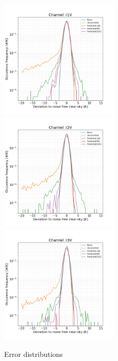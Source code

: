 \documentclass[amt, manuscript]{copernicus}
\begin{document}
\begin{figure}[t]
	\includegraphics[height=57mm]{Figures/ICI_I1V_single.png} 
	\includegraphics[height=57mm]{Figures/ICI_I2V_single.png}
	\includegraphics[height=57mm]{Figures/ICI_I3V_single.png} 
	\caption{Error distributions}
	\label{fig:error_distributions}	
\end{figure}
\end{document}
